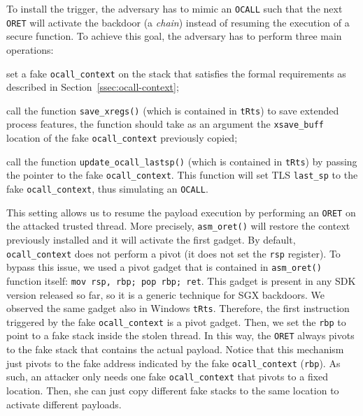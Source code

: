 To install the trigger, the adversary has to mimic an \texttt{OCALL}
such that 
the next \texttt{ORET} will activate the backdoor (\ie a \emph{chain}) instead 
of resuming the execution of a secure function.
To achieve this goal, the adversary has to perform three main operations:
\begin{enumerate*}[label=(\roman*)]
	\item set a fake \texttt{ocall\_context} on the stack that satisfies the 
	formal requirements as described in Section~\ref{ssec:ocall-context};
	\item call the function \texttt{save\_xregs()} (which is contained in 
	\texttt{tRts}) to save extended process features, the function should take 
	as an argument the \texttt{xsave\_buff} location of the fake 
	\texttt{ocall\_context} previously copied;
	\item call the function \texttt{update\_ocall\_lastsp()} (which is 
	contained in \texttt{tRts}) by passing the pointer to the fake 
	\texttt{ocall\_context}. This function will set TLS \texttt{last\_sp} 
	to the fake \texttt{ocall\_context}, thus simulating an \texttt{OCALL}.
\end{enumerate*}

This setting allows us to resume the payload execution by performing an 
\texttt{ORET} on the attacked trusted thread.
More precisely, \texttt{asm\_oret()} will restore the context previously 
installed and it will activate the first gadget.
By default, \texttt{ocall\_context} does not perform a pivot (\ie it does not 
set the \texttt{rsp} register).
To bypass this issue, we used a pivot gadget that is contained in 
\texttt{asm\_oret()} function itself:\textsl{} \texttt{mov rsp, rbp; pop rbp; 
	ret}.
This gadget is present in any SDK version released so far, so it is a generic 
technique for SGX backdoors.
We observed the same gadget also in Windows \texttt{tRts}.
Therefore, the first instruction triggered by the fake \texttt{ocall\_context} 
is a pivot gadget.
Then, we set the \texttt{rbp} to point to a fake stack inside the stolen 
thread. 
In this way, the \texttt{ORET} always pivots to the fake stack that contains 
the actual payload.
Notice that this mechanism just pivots to the fake address indicated by the 
fake \texttt{ocall\_context} (\ie \texttt{rbp}).
As such, an attacker only needs one fake \texttt{ocall\_context} that pivots to 
a fixed location.
Then, she can just copy different fake stacks to the same location to activate 
different payloads.


